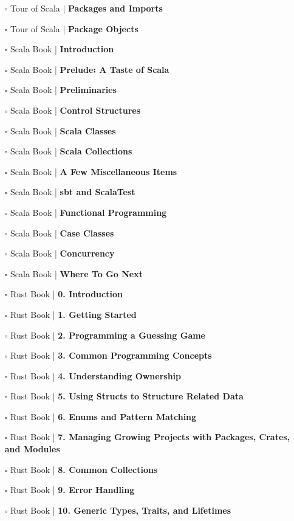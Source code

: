 \documentclass[a4, landscape, 12pt]{article}
\newcommand{\checkbox}{$\square$}%
\begin{document}
\begin{itemize}
{}
\item [\checkbox]  Tour of Scala  | \textbf{ Packages and Imports
}
\item [\checkbox]  Tour of Scala  | \textbf{ Package Objects
}
\item [\checkbox]  Scala Book | \textbf{ Introduction
}
\item [\checkbox]  Scala Book | \textbf{ Prelude꞉ A Taste of Scala
}
\item [\checkbox]  Scala Book | \textbf{ Preliminaries
}
\item [\checkbox]  Scala Book | \textbf{ Control Structures
}
\item [\checkbox]  Scala Book | \textbf{ Scala Classes
}
\item [\checkbox]  Scala Book | \textbf{ Scala Collections
}
\item [\checkbox]  Scala Book | \textbf{ A Few Miscellaneous Items
}
\item [\checkbox]  Scala Book | \textbf{ sbt and ScalaTest
}
\item [\checkbox]  Scala Book | \textbf{ Functional Programming
}
\item [\checkbox]  Scala Book | \textbf{ Case Classes
}
\item [\checkbox]  Scala Book | \textbf{ Concurrency
}
\item [\checkbox]  Scala Book | \textbf{ Where To Go Next
}
\item [\checkbox]  Rust Book  | \textbf{ 0. Introduction
}
\item [\checkbox]  Rust Book  | \textbf{ 1. Getting Started
}
\item [\checkbox]  Rust Book  | \textbf{ 2. Programming a Guessing Game
}
\item [\checkbox]  Rust Book  | \textbf{ 3. Common Programming Concepts
}
\item [\checkbox]  Rust Book  | \textbf{ 4. Understanding Ownership
}
\item [\checkbox]  Rust Book  | \textbf{ 5. Using Structs to Structure Related Data
}
\item [\checkbox]  Rust Book  | \textbf{ 6. Enums and Pattern Matching
}
\item [\checkbox]  Rust Book  | \textbf{ 7. Managing Growing Projects with Packages, Crates, and Modules
}
\item [\checkbox]  Rust Book  | \textbf{ 8. Common Collections
}
\item [\checkbox]  Rust Book  | \textbf{ 9. Error Handling
}
\item [\checkbox]  Rust Book  | \textbf{ 10. Generic Types, Traits, and Lifetimes
}
\end{itemize}
\end{document}

